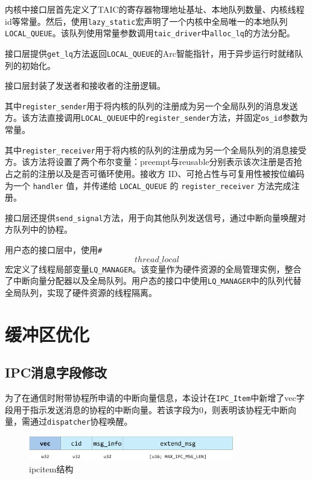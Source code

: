 内核中接口层首先定义了TAIC的寄存器物理地址基址、本地队列数量、内核线程id等常量。然后，使用\texttt{lazy\_static}宏声明了一个内核中全局唯一的本地队列\texttt{LOCAL\_QUEUE}。该队列使用常量参数调用\texttt{taic\_driver}中\texttt{alloc\_lq}的方法分配。

接口层提供\texttt{get\_lq}方法返回\texttt{LOCAL\_QUEUE}的Arc智能指针，用于异步运行时就绪队列的初始化。

接口层封装了发送者和接收者的注册逻辑。

其中\texttt{register\_sender}用于将内核的队列的注册成为另一个全局队列的消息发送方。该方法直接调用\texttt{LOCAL\_QUEUE}中的\texttt{register\_sender}方法，并固定\texttt{os\_id}参数为常量。

其中\texttt{register\_receiver}用于将内核的队列的注册成为另一个全局队列的消息接受方。该方法将设置了两个布尔变量：preempt与reusable分别表示该次注册是否抢占之前的注册以及是否可循环使用。接收方 ID、可抢占性与可复用性被按位编码为一个 \texttt{handler} 值，并传递给 \texttt{LOCAL\_QUEUE} 的 \texttt{register\_receiver} 方法完成注册。

接口层还提供\texttt{send\_signal}方法，用于向其他队列发送信号，通过中断向量唤醒对方队列中的协程。

用户态的接口层中，使用\texttt{\#\[thread\_local\]}宏定义了线程局部变量\texttt{LQ\_MANAGER}。该变量作为硬件资源的全局管理实例，整合了中断向量分配器以及全局队列。用户态的接口中使用\texttt{LQ\_MANAGER}中的队列代替全局队列，实现了硬件资源的线程隔离。

\section{缓冲区优化}

\subsection{IPC消息字段修改}

为了在通信时附带协程所申请的中断向量信息，本设计在\texttt{IPC\_Item}中新增了vec字段用于指示发送消息的协程的中断向量。若该字段为0，则表明该协程无中断向量，需通过\texttt{dispatcher}协程唤醒。

\begin{figure}[htbp]
  \centering
  \includegraphics[width=0.8\textwidth]{images/ipc_item.png}
  \caption{ipcitem结构}\label{ipc_item结构}
\end{figure}

